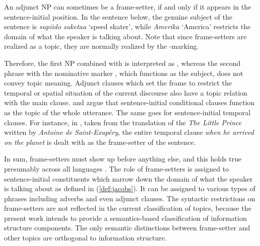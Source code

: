 \noindent An adjunct NP can sometimes be a frame-setter, if and only
if it appears in the sentence-initial position. In the 
sentence  below, the genuine subject of
the sentence is \textit{supiido suketaa} `speed skater', while
\textit{Amerika} `America' restricts the domain of what the speaker is
talking about. Note that since frame-setters are realized as a topic,
they are normally realized by the
\wa-marking.



\noindent Therefore, the first NP combined with \wa is interpreted as
, whereas the second phrase with the nominative marker \ga, which
functions as the subject, does not convey topic meaning.  Adjunct
clauses which set the frame to restrict the temporal or spatial
situation of the current discourse also have a topic relation with the
main clause.  \citet{haiman:78} and \citet{ramsay:87} argue that
sentence-initial conditional clauses function as the topic of the
whole utterance.  The same goes for sentence-initial temporal
clauses. For instance, in , taken from
the translation of the \textit{The
  Little Prince} written by \textit{Antoine de Saint-Exup{\'e}ry}, the
entire temporal clause \textit{when he arrived on the planet} is dealt
with as the frame-setter of the sentence.



















In sum, frame-setters must show up before anything else, and this
holds true presumably across all languages
\citep{chafe:76,lambrecht:96}. The role of frame-setters is assigned
to sentence-initial constituents which narrow down the domain of what
the speaker is talking about as defined in (\ref{def:jacobs}).  It can
be assigned to various types of phrases including adverbs and even
adjunct clauses.  The syntactic restrictions on frame-setters are not
reflected in the current classification of topics, because the present
work intends to provide a semantics-based classification of
information structure components.  The only semantic distinctions
between frame-setter and other topics are orthogonal to information
structure.



